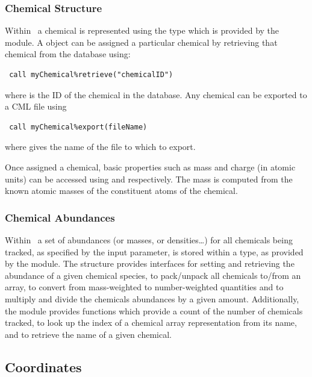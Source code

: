 \subsubsection{Chemical Structure}

Within \glc\ a chemical is represented using the  type which is provided by the  module. A  object can be assigned a particular chemical by retrieving that chemical from the database using:
\begin{verbatim}
 call myChemical%retrieve("chemicalID")
\end{verbatim}
where  is the ID of the chemical in the database. Any chemical can be exported to a CML file using
\begin{verbatim}
 call myChemical%export(fileName)
\end{verbatim}
where  gives the name of the file to which to export.

Once assigned a chemical, basic properties such as mass and charge (in atomic units) can be accessed using  and  respectively. The mass is computed from the known atomic masses of the constituent atoms of the chemical.

\subsubsection{Chemical Abundances}

Within \glc\ a set of abundances (or masses, or densities\ldots) for all chemicals being tracked, as specified by the \mono{[chemicalsToTrack]} input parameter, is stored within a  type, as provided by the  module. The structure provides interfaces for setting and retrieving the abundance of a given chemical species, to pack/unpack all chemicals to/from an array, to convert from mass-weighted to number-weighted quantities and to multiply and divide the chemicals abundances by a given amount. Additionally, the  module provides functions which provide a count of the number of chemicals tracked, to look up the index of a chemical array representation from its name, and to retrieve the name of a given chemical.

\subsection{Coordinates}\label{sec:Coordinates}

